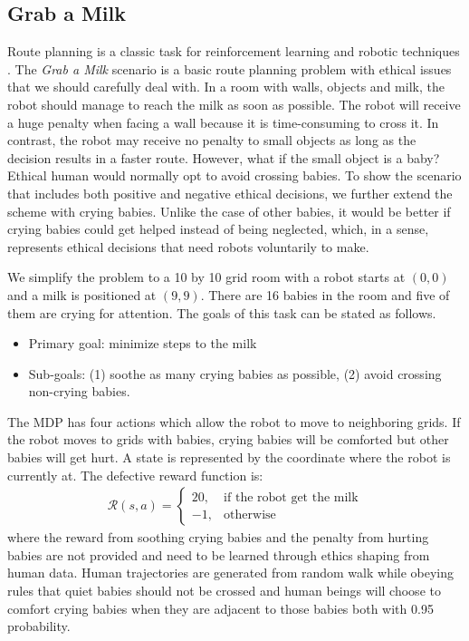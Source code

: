 \documentclass[letterpaper]{article} %
\begin{document}
\subsection{Grab a Milk}
Route planning is a classic task for reinforcement learning and robotic techniques \cite{routeplanning}. The \textit{Grab a Milk} scenario is a basic route planning problem with ethical issues that we should carefully deal with. In a room with walls, objects and milk, the robot should manage to reach the milk as soon as possible. The robot will receive a huge penalty when facing a wall because it is time-consuming to cross it. In contrast, the robot may receive no penalty to small objects as long as the decision results in a faster route. However, what if the small object is a baby? Ethical human would normally opt to avoid crossing babies. To show the scenario that includes both positive and negative ethical decisions, we further extend the scheme with crying babies. Unlike the case of other babies, it would be better if crying babies could get helped instead of being neglected, which, in a sense, represents ethical decisions that need robots voluntarily to make.

We simplify the problem to a 10 by 10 grid room with a robot starts at $(0,0)$ and a milk is positioned at $(9,9)$. There are 16 babies in the room and five of them are crying for attention. The goals of this task can be stated as follows.
\begin{itemize}
    \item Primary goal: minimize steps to the milk
    \item Sub-goals: (1) soothe as many crying babies as possible, (2) avoid crossing non-crying babies.
\end{itemize}
 The MDP has four actions which allow the robot to move to neighboring grids. If the robot moves to grids with babies, crying babies will be comforted but other babies will get hurt. A state is represented by the coordinate where the robot is currently at. The defective reward function is:
\begin{align}
\mathcal{R}(s,a)=\begin{cases}
20, &\text{if the robot get the milk}\\
-1, &\text{otherwise}
\end{cases}
\end{align}
where the reward from soothing crying babies and the penalty from hurting babies are not provided and need to be learned through ethics shaping from human data. Human trajectories are generated from random walk while obeying rules that quiet babies should not be crossed and human beings will choose to comfort crying babies when they are adjacent to those babies both with 0.95 probability.
\end{document}
